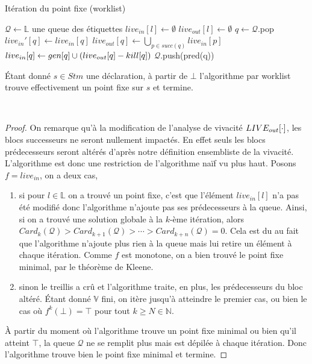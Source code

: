 \documentclass[a4paper, 10pt]{article}
\begin{document}
\begin{algorithm}[H]
	\caption{Itération du point fixe (worklist)}
	\begin{algorithmic}
		\State $\mathcal{Q} \leftarrow \mathbb{L}$ une queue des étiquettes
		\State $live_{in}[l] \leftarrow \emptyset$
		\State $live_{out}[l] \leftarrow \emptyset$
		\EndFor
		\State $q \leftarrow \mathcal{Q}$.pop
		\State $live_{in}'[q] \leftarrow live_{in}[q]$
		\State $live_{out}[q] \leftarrow \bigcup\limits_{p\in succ(q)} live_{in}[p]$
		\State $live_{in}[q] \leftarrow gen[q] \cup (live_{out}[q] - kill[q])$
		\State $\mathcal{Q}$.push(pred(q))
		\EndIf
		\EndWhile
	\end{algorithmic}
\end{algorithm}
\noindent
\begin{lemma}
	Étant donné $s \in Stm$ une déclaration, à partir de $\bot$ l'algorithme par worklist trouve effectivement
	un point fixe sur $s$ et termine.
\end{lemma}
\\
\begin{proof}
On remarque qu'à la modification de l'analyse de vivacité $LIVE_{out}[\cdot]$,
les blocs successeurs ne seront nullement impactés. En effet seuls les blocs prédecesseurs seront
altérés d'après notre définition ensembliste de la vivacité. L'algorithme est donc une restriction de l'algorithme naïf vu plus
haut. Posons $f = live_{in}$, on a deux cas,
\begin{enumerate}
	\item si pour $l \in \mathbb{L}$ on a trouvé un point fixe, c'est que l'élément $live_{in}[l]$ n'a pas été modifié donc
	l'algorithme n'ajoute pas ses prédecesseurs à la queue. Ainsi, si on a trouvé une solution globale à la $k$-ème itération, 
	alors $Card_k(\mathcal{Q}) > Card_{k+1}(\mathcal{Q}) > \cdots > Card_{k + n}(\mathcal{Q}) = 0$. Cela est du au fait que
	l'algorithme n'ajoute plus rien à la queue mais lui retire un élément à chaque itération. Comme $f$ est monotone, on
	a bien trouvé le point fixe minimal, par le théorème de Kleene.
	\item sinon le treillis a crû et l'algorithme traite, en plus, les prédecesseurs du bloc altéré. Étant donné $\mathbb{V}$ fini,
	on itère jusqu'à atteindre le premier cas, ou bien le cas où $f^k(\bot) = \top$ pour tout $k \ge N \in \mathbb{N}$.
\end{enumerate}
À partir du moment où l'algorithme trouve un point fixe minimal ou bien qu'il atteint $\top$, la queue $\mathcal{Q}$ ne se remplit
plus mais est dépilée à chaque itération. Donc l'algorithme trouve bien le point fixe minimal et termine.
\end{proof}
\end{document}
